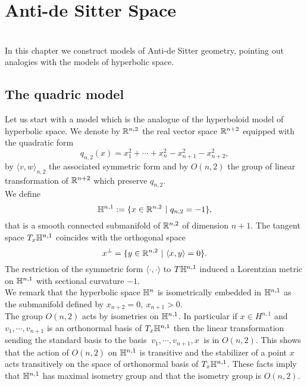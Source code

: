 \chapter{Anti-de Sitter Space} \label{chapter:2}

\\
In this chapter we construct models of Anti-de Sitter geometry, pointing out analogies with the models of hyperbolic space.

\section{The quadric model}
Let us start with a model which is the analogue of the hyperboloid model of hyperbolic space. We denote by $\mathbb{R} ^{n,2}$ the real vector space $\mathbb{R} ^{n+2}$ equipped with the quadratic form
\[
q_{n,2}(x) = x_1^2 + \cdots + x_n^2 - x_{n+1}^2 - x_{n+2}^2,
\]
by $\langle v,w \rangle_{n,2}$ the associated symmetric form and by $O(n,2)$ the group of linear transformation of $\mathbb{R}^{n+2}$ which preserve $q_{n,2}$.\\
We define
\[
\mathbb{H}^{n,1} := \{ x\in \mathbb{R}^{n,2} \ | \ q_{n,2} = -1 \},
\]
that is a smooth connected submanifold of $\mathbb{R}^{n,2}$ of dimension $n+1$. The tangent space $T_x \mathbb{H}^{n,1}$ coincides with the orthogonal space
\[
x^\perp = \{ y\in\mathbb{R}^{n,2} \ | \ \langle x,y \rangle=0 \}.
\]
The restriction of the symmetric form $\langle \cdot , \cdot \rangle$ to $T\mathbb{H}^{n,1}$ induced a Lorentzian metric on $\mathbb{H}^{n,1}$ with sectional curvature $-1$.\\
We remark that the hyperbolic space $\mathbb{H}^n$ is isometrically embedded in $\mathbb{H}^{n,1}$ as the submanifold defined by $x_{n+2}=0,\ x_{n+1}>0$.\\
The group $O(n,2)$ acts by isometries on $\mathbb{H}^{n,1}$. In particular if $x\in H^{n,1}$ and $v_1, \cdots , v_{n+1}$ is an orthonormal basis of $T_x \mathbb{H}^{n,1}$ then the linear transformation sending the standard basis to the basis $\ v_1,\cdots,v_{n+1},x \ $ is in $O(n,2)$. This shows that the action of $O(n,2)$ on $\mathbb{H}^{n,1}$ is transitive and the stabilizer of a point $x$ acts transitively on the space of orthonormal basis of $T_x\mathbb{H}^{n,1}$. 
These facts imply that $\mathbb{H}^{n,1}$ has maximal isometry group and that the isometry group is $O(n,2)$.\\

